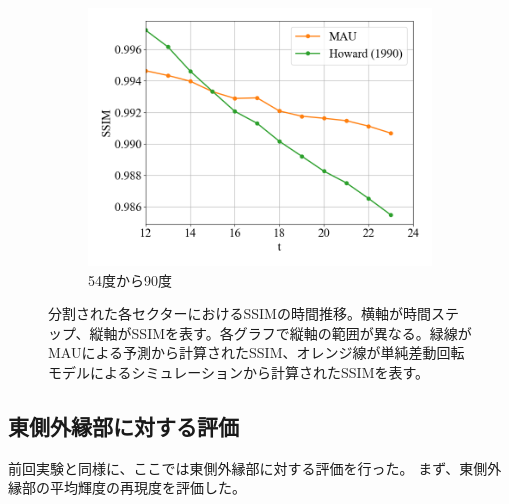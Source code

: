 \begin{figure}[htbp]
            \begin{subfigure}{0.5\textwidth}
              \centering
              \includegraphics[width=\textwidth]{figures/exp2/lng_ssim_5.png}
              \caption{54度から90度}
            \end{subfigure}
          \caption{分割された各セクターにおけるSSIMの時間推移。横軸が時間ステップ、縦軸がSSIMを表す。各グラフで縦軸の範囲が異なる。緑線がMAUによる予測から計算されたSSIM、オレンジ線が単純差動回転モデルによるシミュレーションから計算されたSSIMを表す。}
          \label{fig:exp2_lng_ssim}
        \end{figure}


    \subsection{東側外縁部に対する評価}
        前回実験と同様に、ここでは東側外縁部に対する評価を行った。
        まず、東側外縁部の平均輝度の再現度を評価した。
